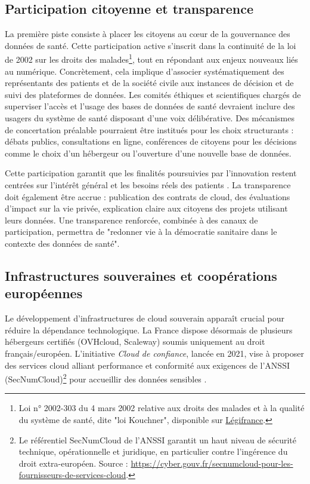 \documentclass[10pt,a4paper]{article}
\begin{document}
\subsection{Participation citoyenne et transparence}

La première piste consiste à placer les citoyens au cœur de la gouvernance des données de santé. Cette participation active s’inscrit dans la continuité de la loi de 2002 sur les droits des malades\footnote{Loi n° 2002-303 du 4 mars 2002 relative aux droits des malades et à la qualité du système de santé, dite "loi Kouchner", disponible sur \href{https://www.legifrance.gouv.fr/jorf/id/JORFTEXT000000227015/}{Légifrance}.}, tout en répondant aux enjeux nouveaux liés au numérique. Concrètement, cela implique d'associer systématiquement des représentants des patients et de la société civile aux instances de décision et de suivi des plateformes de données. Les comités éthiques et scientifiques chargés de superviser l’accès et l’usage des bases de données de santé devraient inclure des usagers du système de santé disposant d’une voix délibérative. Des mécanismes de concertation préalable pourraient être institués pour les choix structurants : débats publics, consultations en ligne, conférences de citoyens pour les décisions comme le choix d'un hébergeur ou l'ouverture d'une nouvelle base de données.

Cette participation garantit que les finalités poursuivies par l'innovation restent centrées sur l'intérêt général et les besoins réels des patients \parencite{RenaissanceNumerique2021HealthData}. La transparence doit également être accrue : publication des contrats de cloud, des évaluations d'impact sur la vie privée, explication claire aux citoyens des projets utilisant leurs données. Une transparence renforcée, combinée à des canaux de participation, permettra de "redonner vie à la démocratie sanitaire dans le contexte des données de santé".

\subsection{Infrastructures souveraines et coopérations européennes}

Le développement d'infrastructures de cloud souverain apparaît crucial pour réduire la dépendance technologique. La France dispose désormais de plusieurs hébergeurs certifiés (OVHcloud, Scaleway) soumis uniquement au droit français/européen. L'initiative \textit{Cloud de confiance}, lancée en 2021, vise à proposer des services cloud alliant performance et conformité aux exigences de l'ANSSI (SecNumCloud)\footnote{Le référentiel SecNumCloud de l'ANSSI garantit un haut niveau de sécurité technique, opérationnelle et juridique, en particulier contre l’ingérence du droit extra-européen. Source : \url{https://cyber.gouv.fr/secnumcloud-pour-les-fournisseurs-de-services-cloud}.} pour accueillir des données sensibles \parencite{ANSSI2022}.
\end{document}
